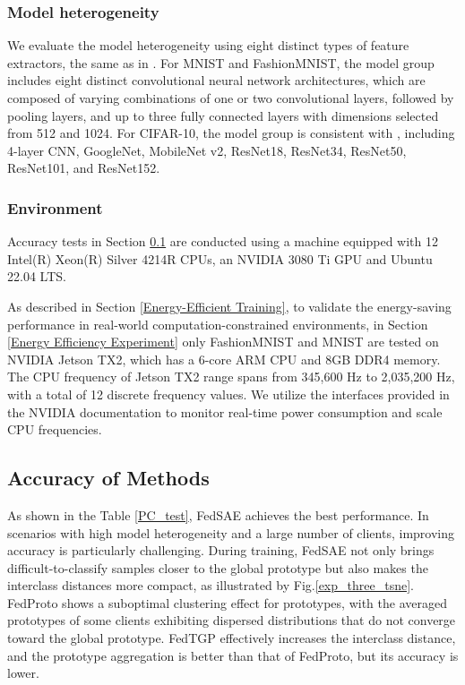 \documentclass[journal]{IEEEtran}
\begin{document}
\subsubsection{Model heterogeneity}
We evaluate the model heterogeneity using eight distinct types of feature extractors, the same as in  \cite{zhang_fedtgp_2024}. For MNIST and FashionMNIST,  the model group includes eight distinct convolutional neural network architectures, which are composed of varying combinations of one or two convolutional layers, followed by pooling layers, and up to three fully connected layers with dimensions selected from 512 and 1024. For CIFAR-10, the model group is consistent with \cite{zhang_fedtgp_2024}, including 4-layer CNN, GoogleNet, MobileNet v2, ResNet18, ResNet34, ResNet50, ResNet101, and ResNet152.

\subsubsection{Environment}
Accuracy tests in Section \ref{Accuracy of Methods} are conducted using a machine equipped with 12 Intel(R) Xeon(R) Silver 4214R CPUs, an NVIDIA 3080 Ti GPU and Ubuntu 22.04 LTS.

As described in Section \ref{Energy-Efficient Training}, to validate the energy-saving performance in real-world computation-constrained environments, in Section \ref{Energy Efficiency Experiment} only FashionMNIST and MNIST are tested on NVIDIA Jetson TX2, which has a 6-core ARM CPU and 8GB DDR4 memory. The CPU frequency of Jetson TX2 range spans from 345,600 Hz to 2,035,200 Hz, with a total of 12 discrete frequency values. We utilize the interfaces provided in the NVIDIA documentation to monitor real-time power consumption and scale CPU frequencies.


\subsection{Accuracy of Methods}
\label{Accuracy of Methods}
As shown in the Table \ref{PC_test}, FedSAE achieves the best performance. In scenarios with high model heterogeneity and a large number of clients, improving accuracy is particularly challenging. During training, FedSAE not only brings difficult-to-classify samples closer to the global prototype but also makes the interclass distances more compact, as illustrated by Fig.\ref{exp_three_tsne}. FedProto shows a suboptimal clustering effect for prototypes, with the averaged prototypes of some clients exhibiting dispersed distributions that do not converge toward the global prototype. FedTGP effectively increases the interclass distance, and the prototype aggregation is better than that of FedProto, but its accuracy is lower.
\end{document}
